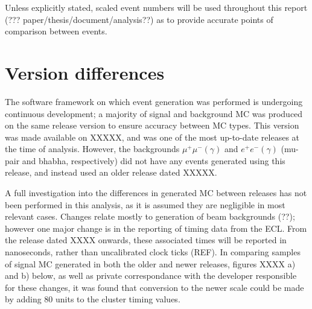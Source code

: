 \documentclass[12pt]{thesis}  %
\begin{document}
Unless explicitly stated, scaled event numbers will be used throughout this report (??? paper/thesis/document/analysis??) as to provide accurate points of comparison between events.


\section{Version differences}

The software framework on which event generation was performed is undergoing continuous development; a majority of signal and background MC was produced on the same release version to ensure accuracy between MC types. This version was made available on XXXXX, and was one of the most up-to-date releases at the time of analysis. However, the backgrounds $\mu^+\mu^-(\gamma)$ and $e^+ e^-(\gamma)$ (mu-pair and bhabha, respectively) did not have any events generated using this release, and instead used an older release dated XXXXX.

A full investigation into the differences in generated MC between releases has not been performed in this analysis, as it is assumed they are negligible in most relevant cases. Changes relate mostly to generation of beam backgrounds (??); however one major change is in the reporting of timing data from the ECL. From the release dated XXXX onwards, these associated times will be reported in nanoseconds, rather than uncalibrated clock ticks (REF). In comparing samples of signal MC generated in both the older and newer releases, figures XXXX a) and b) below, as well as private correspondance with the developer responsible for these changes, it was found that conversion to the newer scale could be made by adding 80 units to the cluster timing values.
\end{document}
